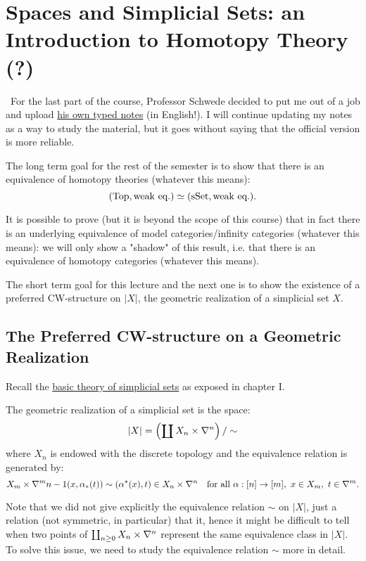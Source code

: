 
\chapter{Spaces and Simplicial Sets: an Introduction to Homotopy Theory (?)}\label{chapter:the-cool-chapter}

\Attention\ For the last part of the course, Professor Schwede decided to put me out of a job and upload \href{https://www.math.uni-bonn.de/people/schwede/sset_vs_spaces.pdf}{his own typed notes} (in English!). I will continue updating my notes as a way to study the material, but it goes without saying that the official version is more reliable.\medskip


The long term goal for the rest of the semester is to show that there is an equivalence of homotopy theories (whatever this means):
\[({\mathrm{Top}},\text{weak eq.})\simeq({\mathrm{sSet}},\text{weak eq.}).\]

It is possible to prove (but it is beyond the scope of this course) that in fact there is an underlying equivalence of model categories/infinity categories (whatever this means): we will only show a "shadow" of this result, i.e. that there is an equivalence of homotopy categories (whatever this means).

The short term goal for this lecture and the next one is to show the existence of a preferred CW-structure on $|X|$, the geometric realization of a simplicial set $X$.

\section{The Preferred CW-structure on a Geometric Realization}
Recall the \hyperref[section:reminder-on-sset]{basic theory of simplicial sets} as exposed in chapter I.

The geometric realization of a simplicial set is the space:
\[|X|=\left(\coprod X_n\times\nabla^n\right)/\sim\]
where $X_n$ is endowed with the discrete topology and the equivalence relation is generated by:
\[X_m\times\nabla^m\cont(x,\alpha_*(t))\sim(\alpha^*(x),t)\in X_n\times\nabla^n\quad\text{for all }\alpha:[n]\to[m],\ x\in X_m,\ t\in\nabla^m.\]

Note that we did not give explicitly the equivalence relation $\sim$ on $|X|$, just a relation (not symmetric, in particular) that  it,
hence it might be difficult to tell when two points of $\coprod_{n\ge0} X_n\times\nabla^n$ represent the same equivalence class in $|X|$.
To solve this issue, we need to study the equivalence relation $\sim$ more in detail.

